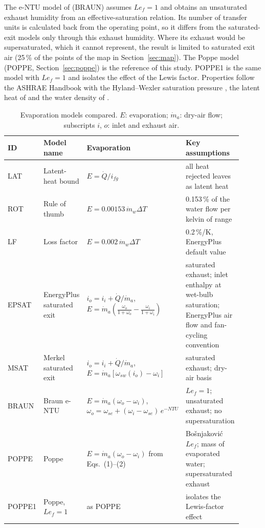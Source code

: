 \documentclass[preprint,12pt]{elsarticle}
\begin{document}
The e-NTU model of \citet{braun1989effectiveness} (BRAUN) assumes $Le_f=1$
and obtains an unsaturated exhaust humidity from an effective-saturation relation. Its number of transfer units is
calculated back from the operating point, so it differs from the saturated-exit models only through this exhaust
humidity. Where its exhaust would be supersaturated, which it cannot represent, the result is limited to saturated exit
air (25\,\% of the points of the map in Section~\ref{sec:map}). The Poppe model (POPPE, Section~\ref{sec:poppe}) is the reference
of this study. POPPE1 is the same model with $Le_f=1$ and isolates the effect of the Lewis factor. Properties follow the
ASHRAE Handbook \citep{ashrae2021fundamentals} with the Hyland--Wexler saturation pressure
\citep{hyland1983formulations}, the latent heat of \citet{hendersonsellers1984new} and the water density of
\citet{kell1975density}.

\begin{table}[t]\centering\scriptsize
\caption{Evaporation models compared. $E$: evaporation; $\dot m_a$: dry-air flow; subscripts $i$, $o$: inlet and
exhaust air.}\label{tab:methods}
\begin{tabular}{p{0.08\linewidth}p{0.2\linewidth}p{0.33\linewidth}p{0.3\linewidth}}\toprule
ID & Model name & Evaporation & Key assumptions \\\midrule
LAT & Latent-heat bound & $E=\dot Q/i_{fg}$ & all heat rejected leaves as latent heat \\
ROT & Rule of thumb \citep{green2008perrys} & $E=0.00153\,\dot m_w\Delta T$ & 0.153\,\% of the water flow per kelvin of
range \\
LF & Loss factor & $E=0.002\,\dot m_w\Delta T$ & 0.2\,\%/K, EnergyPlus default value \\
EPSAT & EnergyPlus saturated exit \citep{doe2022engref} & $i_{o}=i_{i}+\dot Q/\dot m_a$, $E=\dot m_a\left(
\frac{\omega_{o}}{1+\omega_{o}}-\frac{\omega_{i}}{1+\omega_{i}}\right)$ & saturated exhaust; inlet enthalpy at
wet-bulb saturation; EnergyPlus air flow and fan-cycling convention \\
MSAT & Merkel saturated exit \citep{merkel1925verdunstungskuhlung} & $i_{o}=i_{i}+\dot Q/\dot m_a$,
$E=\dot m_a\left[\omega_{sw}(i_o)-\omega_i\right]$ & saturated exhaust; dry-air basis \\
BRAUN & Braun e-NTU \citep{braun1989effectiveness} & $E=\dot m_a(\omega_o-\omega_i)$,
$\omega_o=\omega_{se}+(\omega_i-\omega_{se})\,e^{-NTU}$ & $Le_f=1$; unsaturated exhaust; no supersaturation \\
POPPE & Poppe \citep{poppe1991berechnung,kloppers2005critical} & $E=\dot m_a(\omega_o-\omega_i)$ from
Eqs.~(1)--(2) & Bo\v{s}njakovi\'c $Le_f$; mass of evaporated water; supersaturated exhaust \\
POPPE1 & Poppe, $Le_f=1$ & as POPPE & isolates the Lewis-factor effect \\\bottomrule
\end{tabular}
\end{table}
\end{document}
